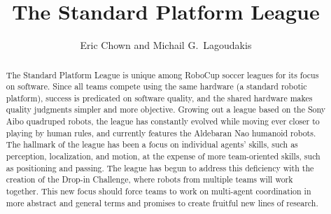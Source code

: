 \documentclass{llncs}
\begin{document}
\title{The Standard Platform League}




\author{ Eric Chown and Michail G.~Lagoudakis}





\maketitle

\begin{abstract}
The Standard Platform League is unique among RoboCup soccer leagues for
its focus on software. Since all teams compete using the same hardware (a standard robotic platform),
success is predicated on software quality, and the shared hardware
makes quality judgments simpler and more objective. Growing out a league
based on the Sony Aibo quadruped robots, the league has constantly evolved while moving ever
closer to playing by human rules, and currently features the Aldebaran Nao humanoid robots. The hallmark of the league has been
a focus on individual agents' skills, such as perception, localization, and motion, at the expense
of more team-oriented skills, such as positioning and passing. The league has begun to address this deficiency
with the creation of the Drop-in Challenge, where robots
from multiple teams will work together. This new focus should force teams to work
on multi-agent coordination in more abstract and general terms and promises
to create fruitful new lines of research.
\end{abstract}
\end{document}
